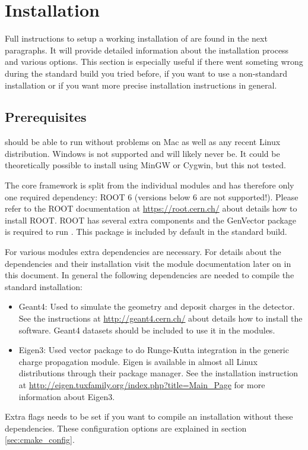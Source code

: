 \section{Installation}
\label{sec:installation}
Full instructions to setup a working installation of \apsq are found in the next paragraphs. It will provide detailed information about the installation process and various options. This section is especially useful if there went someting wrong during the standard build you tried before, if you want to use a non-standard installation or if you want more precise installation instructions in general.
\subsection{Prerequisites}
\label{sec:prerequisites}
\apsq should be able to run without problems on Mac as well as any recent Linux distribution. Windows is not supported and will likely never be. It could be theoretically possible to install \apsq using MinGW or Cygwin, but this not tested.

The core framework is split from the individual modules and \apsq has therefore only one required dependency: ROOT 6 (versions below 6 are not supported!). Please refer to the ROOT documentation at \url{https://root.cern.ch/} about details how to install ROOT. ROOT has several extra components and the GenVector package is required to run \apsq. This package is included by default in the standard build.

For various modules extra dependencies are necessary. For details about the dependencies and their installation visit the module documentation later on in this document. In general the following dependencies are needed to compile the standard installation:
\begin{itemize}
\item Geant4: Used to simulate the geometry and deposit charges in the detector. See the instructions at \url{http://geant4.cern.ch/} about details how to install the software. Geant4 datasets should be included to use it in the modules.
\item Eigen3: Used vector package to do Runge-Kutta integration in the generic charge propagation module. Eigen is available in almost all Linux distributions through their package manager. See the installation instruction at \url{http://eigen.tuxfamily.org/index.php?title=Main_Page} for more information about Eigen3.
\end{itemize}
Extra flags needs to be set if you want to compile an \apsq installation without these dependencies. These configuration options are explained in section \ref{sec:cmake_config}.

